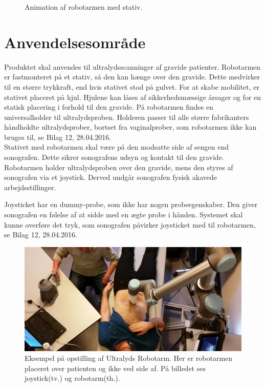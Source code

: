 \begin{figure}[H]
\begin{minipage}{0.55\textwidth}
		\caption{Animation af robotarmen med stativ.}
		\label{Robotstativ}
	\end{minipage}
\end{figure}

\section{Anvendelsesområde}
Produktet skal anvendes til ultralydsscanninger af gravide patienter. Robotarmen er fastmonteret på et stativ, så den kan hænge over den gravide. Dette medvirker til en større trykkraft, end hvis stativet stod på gulvet. For at skabe mobilitet, er stativet placeret på hjul. Hjulene kan låses af sikkerhedsmæssige årsager og for en statisk placering i forhold til den gravide. På robotarmen findes en universalholder til ultralydsproben. Holderen passer til alle større fabrikanters håndholdte ultralydsprober, bortset fra vaginalprober, som robotarmen ikke kan bruges til, se Bilag 12, 28.04.2016.\\

Stativet med robotarmen skal være på den modsatte side af sengen end sonografen. Dette sikrer sonografens udsyn og kontakt til den gravide. \\
Robotarmen holder ultralydsproben over den gravide, mens den styres af sonografen via et joystick. Derved undgår sonografen fysisk akavede arbejdsstillinger.

Joysticket har en dummy-probe, som ikke har nogen probeegenskaber. Den giver sonografen en følelse af at sidde med en ægte probe i hånden.
Systemet skal kunne overføre det tryk, som sonografen påvirker joysticket med til robotarmen, se Bilag 12, 28.04.2016.
 

\begin{figure}[H]\centering
	\includegraphics[width = 1.0\textwidth]{Figurer/ergonomiskLosning.jpg}
	\caption{Eksempel på opstilling af Ultralyds Robotarm. Her er robotarmen placeret over patienten og ikke ved side af. På billedet ses joystick(tv.) og robotarm(th.).  }
	\label{ergonomiskLosning}
\end{figure}


